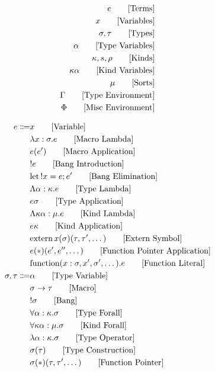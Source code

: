 \documentclass {article}
\begin{document}
\Large

\begin{align*}
e \tag* {[Terms]} \\
x \tag* {[Variables]} \\
\sigma, \tau \tag* {[Types]} \\
\alpha \tag* {[Type Variables]} \\
\kappa, s, \rho \tag* {[Kinds]} \\
\kappa \alpha \tag*{[Kind Variables]} \\
\mu \tag*{[Sorts]} \\
\Gamma \tag* {[Type Environment]} \\
\Phi \tag* {[Misc Environment]}
\end{align*}

\begin{align*}
e \Coloneqq & x \tag*{[Variable]}\\
& \lambda x : \sigma. e \tag*{[Macro Lambda]}\\
& e(e') \tag*{[Macro Application]}\\
& !e \tag*{[Bang Introduction]} \\
& \text{let} \, !x = e; e' \tag*{[Bang Elimination]} \\ 
& \Lambda \alpha : \kappa. e \tag*{[Type Lambda]} \\
& e \sigma \tag*{[Type Application]} \\
& \Lambda \kappa \alpha : \mu. e \tag*{[Kind Lambda]} \\
& e \kappa \tag*{[Kind Application]} \\
& \text{extern} \, x (\sigma) (\tau, \tau', \dots) \tag*{[Extern Symbol]} \\
& e(*)(e',e'',\dots) \tag*{[Function Pointer Application]} \\
& \text{function} (x : \sigma, x', \sigma', \dots). e \tag*{[Function Literal]}
\\
\sigma, \tau \Coloneqq & \alpha \tag* {[Type Variable]}\\
& \sigma \to \tau \tag*{[Macro]}\\
& !\sigma \tag*{[Bang]} \\
& \forall \alpha : \kappa. \sigma \tag*{[Type Forall]}\\ 
& \forall \kappa \alpha : \mu. \sigma \tag*{[Kind Forall]}\\
& \lambda \alpha : \kappa. \sigma \tag*{[Type Operator]} \\
& \sigma (\tau) \tag*{[Type Construction]} \\
& \sigma (*) (\tau, \tau', \dots) \tag*{[Function Pointer]}\\

\end{align*}
\end{document}
